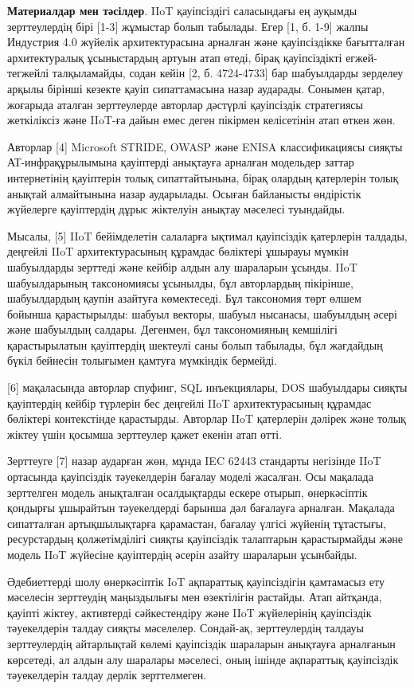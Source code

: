 \begin{multicols}{2}
{\bfseries Материалдар мен тәсілдер}. IIoT қауіпсіздігі саласындағы ең
ауқымды зерттеулердің бірі {[}1-3{]} жұмыстар болып табылады. Егер {[}1,
б. 1-9{]} жалпы Индустрия 4.0 жүйелік архитектурасына арналған және
қауіпсіздікке бағытталған архитектуралық ұсыныстардың артуын атап өтеді,
бірақ қауіпсіздікті егжей-тегжейлі талқыламайды, содан кейін {[}2, б.
4724-4733{]} бар шабуылдарды зерделеу арқылы бірінші кезекте қауіп
сипаттамасына назар аударады. Сонымен қатар, жоғарыда аталған
зерттеулерде авторлар дәстүрлі қауіпсіздік стратегиясы жеткіліксіз және
IIoT-ға дайын емес деген пікірмен келісетінін атап өткен жөн.

Авторлар {[}4{]} Microsoft STRIDE, OWASP және ENISA классификациясы
сияқты АТ-инфрақұрылымына қауіптерді анықтауға арналған модельдер заттар
интернетінің қауіптерін толық сипаттайтынына, бірақ олардың қатерлерін
толық анықтай алмайтынына назар аударылады. Осыған байланысты өндірістік
жүйелерге қауіптердің дұрыс жіктелуін анықтау мәселесі туындайды.

Мысалы, {[}5{]} IIoT бейімделетін салаларға ықтимал қауіпсіздік
қатерлерін талдады, деңгейлі IIoT архитектурасының құрамдас бөліктері
ұшырауы мүмкін шабуылдарды зерттеді және кейбір алдын алу шараларын
ұсынды. IIoT шабуылдарының таксономиясы ұсынылды, бұл авторлардың
пікірінше, шабуылдардың қаупін азайтуға көмектеседі. Бұл таксономия төрт
өлшем бойынша қарастырылды: шабуыл векторы, шабуыл нысанасы, шабуылдың
әсері және шабуылдың салдары. Дегенмен, бұл таксономияның кемшілігі
қарастырылатын қауіптердің шектеулі саны болып табылады, бұл жағдайдың
бүкіл бейнесін толығымен қамтуға мүмкіндік бермейді.

{[}6{]} мақаласында авторлар спуфинг, SQL инъекциялары, DOS шабуылдары
сияқты қауіптердің кейбір түрлерін бес деңгейлі IIoT архитектурасының
құрамдас бөліктері контекстінде қарастырды. Авторлар IIoT қатерлерін
дәлірек және толық жіктеу үшін қосымша зерттеулер қажет екенін атап
өтті.

Зерттеуге {[}7{]} назар аударған жөн, мұнда IEC 62443 стандарты
негізінде IIoT ортасында қауіпсіздік тәуекелдерін бағалау моделі
жасалған. Осы мақалада зерттелген модель анықталған осалдықтарды ескере
отырып, өнеркәсіптік қондырғы ұшырайтын тәуекелдерді барынша дәл
бағалауға арналған. Мақалада сипатталған артықшылықтарға қарамастан,
бағалау үлгісі жүйенің тұтастығы, ресурстардың қолжетімділігі сияқты
қауіпсіздік талаптарын қарастырмайды және модель IIoT жүйесіне
қауіптердің әсерін азайту шараларын ұсынбайды.

Әдебиеттерді шолу өнеркәсіптік IoT ақпараттық қауіпсіздігін қамтамасыз
ету мәселесін зерттеудің маңыздылығы мен өзектілігін растайды. Атап
айтқанда, қауіпті жіктеу, активтерді сәйкестендіру және IIoT жүйелерінің
қауіпсіздік тәуекелдерін талдау сияқты мәселелер. Сондай-ақ,
зерттеулердің талдауы зерттеулердің айтарлықтай көлемі қауіпсіздік
шараларын анықтауға арналғанын көрсетеді, ал алдын алу шаралары
мәселесі, оның ішінде ақпараттық қауіпсіздік тәуекелдерін талдау дерлік
зерттелмеген.


\end{multicols}
